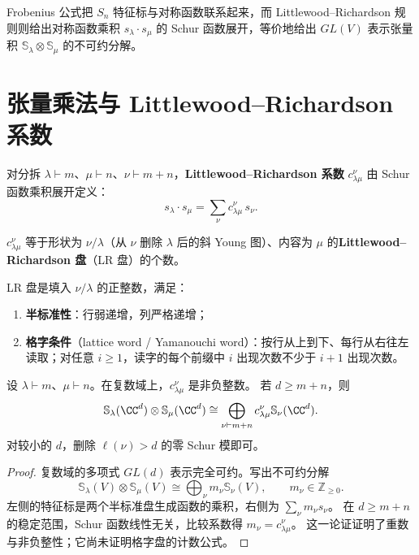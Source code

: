 Frobenius 公式把 $S_n$ 特征标与对称函数联系起来，而 Littlewood--Richardson 规则则给出对称函数乘积 $s_\lambda\cdot s_\mu$ 的 Schur 函数展开，等价地给出 $GL(V)$ 表示张量积 $\mathbb{S}_\lambda\otimes\mathbb{S}_\mu$ 的不可约分解。

\section{张量乘法与 Littlewood--Richardson 系数}

\begin{definition}
对分拆 $\lambda\vdash m$、$\mu\vdash n$、$\nu\vdash m+n$，\textbf{Littlewood--Richardson 系数} $c_{\lambda\mu}^\nu$ 由 Schur 函数乘积展开定义：
\begin{equation}
s_\lambda\cdot s_\mu=\sum_\nu c_{\lambda\mu}^\nu\,s_\nu.
\label{eq:lr-product-rule}
\end{equation}
\label{def:lr-coefficient}
\end{definition}

\begin{theorem}
$c_{\lambda\mu}^\nu$ 等于形状为 $\nu/\lambda$（从 $\nu$ 删除 $\lambda$ 后的斜 Young 图）、内容为 $\mu$ 的\textbf{Littlewood--Richardson 盘}（LR 盘）的个数。

LR 盘是填入 $\nu/\lambda$ 的正整数，满足：
\begin{enumerate}[label=(\roman*),leftmargin=3em]
\item \textbf{半标准性}：行弱递增，列严格递增；
\item \textbf{格字条件}（lattice word / Yamanouchi word）：按行从上到下、每行从右往左读取；对任意 $i\ge1$，读字的每个前缀中 $i$ 出现次数不少于 $i+1$ 出现次数。
\end{enumerate}
\label{thm:lr-rule}
\end{theorem}

\begin{proposition}[LR 系数的表示论含义]
设 $\lambda\vdash m$、$\mu\vdash n$。在复数域上，$c_{\lambda\mu}^\nu$ 是非负整数。
若 $d\ge m+n$，则
\[
\mathbb S_\lambda(\CC^d)\otimes\mathbb S_\mu(\CC^d)
\cong\bigoplus_{\nu\vdash m+n}c_{\lambda\mu}^\nu\mathbb S_\nu(\CC^d).
\]
对较小的 $d$，删除 $\ell(\nu)>d$ 的零 Schur 模即可。
\end{proposition}

\begin{proof}
复数域的多项式 $GL(d)$ 表示完全可约。写出不可约分解
\[
\mathbb S_\lambda(V)\otimes\mathbb S_\mu(V)
\cong\bigoplus_\nu m_\nu\mathbb S_\nu(V),\qquad m_\nu\in\mathbb Z_{\ge0}.
\]
左侧的特征标是两个半标准盘生成函数的乘积，右侧为
$\sum_\nu m_\nu s_\nu$。
在 $d\ge m+n$ 的稳定范围，Schur 函数线性无关，比较系数得
$m_\nu=c_{\lambda\mu}^\nu$。
这一论证证明了重数与非负整性；它尚未证明格字盘的计数公式。
\end{proof}

